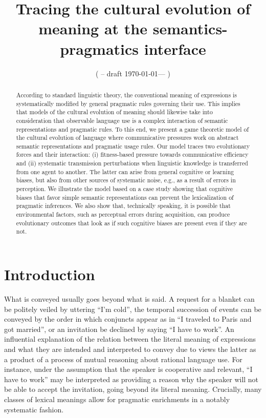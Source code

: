 \documentclass[a4paper]{article}
\title{Tracing the cultural evolution of meaning at the semantics-pragmatics interface}
\author{%
    ( -- draft \today --- )
}
\date{}
\begin{document}
\maketitle

\begin{abstract}
According to standard linguistic theory, the conventional meaning of expressions is systematically modified by general pragmatic rules governing their use. This implies that models of the cultural evolution of meaning should likewise take into consideration that observable language use is a complex interaction of semantic representations and pragmatic rules. To this end, we present a game theoretic model of the cultural evolution of language where communicative pressures work on abstract semantic representations and pragmatic usage rules. Our model traces two evolutionary forces and their interaction: (i) fitness-based pressure towards communicative efficiency and (ii) systematic transmission perturbations when linguistic knowledge is transferred from one agent to another. The latter can arise from general cognitive or learning biases, but also from other sources of systematic noise, e.g., as a result of errors in perception. We illustrate the model based on a case study showing that cognitive biases that favor simple semantic representations can prevent the lexicalization of pragmatic inferences. We also show that, technically speaking, it is possible that environmental factors, such as perceptual errors during acquisition, can produce evolutionary outcomes that look as if such cognitive biases are present even if they are not. 
\end{abstract}

\section{Introduction}\label{sec:introduction}
What is conveyed usually goes beyond what is said. A request for a blanket can be politely veiled by uttering ``I'm cold'', the temporal succession of events can be conveyed by the order in which conjuncts appear as in ``I traveled to Paris and got married'', or an invitation be declined by saying ``I have to work''. An influential explanation of the relation between the literal meaning of expressions and what they are intended and interpreted to convey due to \citet{grice:1975} views the latter as a product of a process of mutual reasoning about rational language use. For instance, under the assumption that the speaker is cooperative and relevant, ``I have to work'' may be interpreted as providing a reason why the speaker will not be able to accept the invitation, going beyond its literal meaning. Crucially, many classes of lexical meanings allow for pragmatic enrichments in a notably systematic fashion. 
\end{document}
